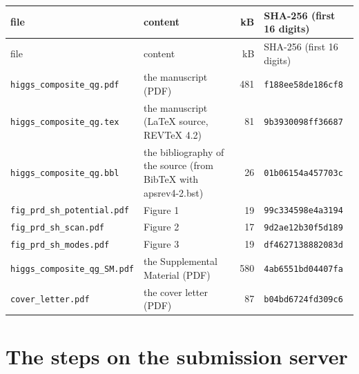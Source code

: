 \documentclass[11pt]{article}
\begin{document}
\begingroup\small\setlength{\tabcolsep}{4pt}
\begin{longtable}{>{\raggedright\arraybackslash}p{}>{\raggedright\arraybackslash}p{}r>{\raggedright\arraybackslash}p{}}
\hline\hline file & content & kB & SHA-256 (first 16 digits) \\ \hline
\endfirsthead
\hline file & content & kB & SHA-256 (first 16 digits) \\ \hline
\endhead
\hline\hline
\endlastfoot
\texttt{higgs\_composite\_qg.pdf} & the manuscript (PDF) & 481 & \texttt{f188ee58de186cf8} \\
\texttt{higgs\_composite\_qg.tex} & the manuscript (LaTeX source, REVTeX 4.2) & 81 & \texttt{9b3930098ff36687} \\
\texttt{higgs\_composite\_qg.bbl} & the bibliography of the source (from BibTeX with apsrev4-2.bst) & 26 & \texttt{01b06154a457703c} \\
\texttt{fig\_prd\_sh\_potential.pdf} & Figure 1 & 19 & \texttt{99c334598e4a3194} \\
\texttt{fig\_prd\_sh\_scan.pdf} & Figure 2 & 17 & \texttt{9d2ae12b30f5d189} \\
\texttt{fig\_prd\_sh\_modes.pdf} & Figure 3 & 19 & \texttt{df4627138882083d} \\
\texttt{higgs\_composite\_qg\_SM.pdf} & the Supplemental Material (PDF) & 580 & \texttt{4ab6551bd04407fa} \\
\texttt{cover\_letter.pdf} & the cover letter (PDF) & 87 & \texttt{b04bd6724fd309c6} \\
\end{longtable}
\endgroup

\section{The steps on the submission server}
\label{sec:steps}
\end{document}
